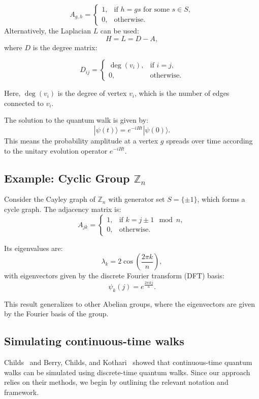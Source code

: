 \documentclass[11pt]{article}
\theoremstyle{definition}
\begin{document}
\[
A_{g,h} =
\begin{cases}
1, & \text{if } h = gs \text{ for some } s \in S, \\
0, & \text{otherwise}.
\end{cases}
\]
 Alternatively, the Laplacian \( L \) can be used:
\[
H = L = D - A,
\]
where \( D \) is the degree matrix:

\[
D_{ij} =
\begin{cases}
\deg(v_i), & \text{if } i = j, \\
0, & \text{otherwise}.
\end{cases}
\]

Here, \( \deg(v_i) \) is the degree of vertex \( v_i \), which is the number of edges connected to \( v_i \).


The solution to the quantum walk is given by:
\[
|\psi(t)\rangle = e^{-i H t} |\psi(0)\rangle.
\]
This means the probability amplitude at a vertex \( g \) spreads over time according to the unitary evolution operator \( e^{-i H t} \).


\subsection*{Example: Cyclic Group \( \mathbb{Z}_n \)}

Consider the Cayley graph of \( \mathbb{Z}_n \) with generator set \( S = \{\pm 1\} \), which forms a cycle graph. The adjacency matrix is:
\[
A_{jk} =
\begin{cases}
1, & \text{if } k = j \pm 1 \mod n, \\
0, & \text{otherwise}.
\end{cases}
\]

Its eigenvalues are:
\[
\lambda_k = 2\cos\left(\frac{2\pi k}{n}\right),
\]
with eigenvectors given by the discrete Fourier transform (DFT) basis:
\[
\psi_k(j) = e^{\frac{2\pi i k j}{n}}.
\]

This result generalizes to other Abelian groups, where the eigenvectors are given by the Fourier basis of the group.


\subsection{Simulating continuous-time walks}
Childs~\cite{childs2010relationship} and Berry, Childs, and Kothari~\cite{berry2015hamiltonian} showed that continuous-time quantum walks can be simulated using discrete-time quantum walks. Since our approach relies on their methods, we begin by outlining the relevant notation and framework.
\end{document}
